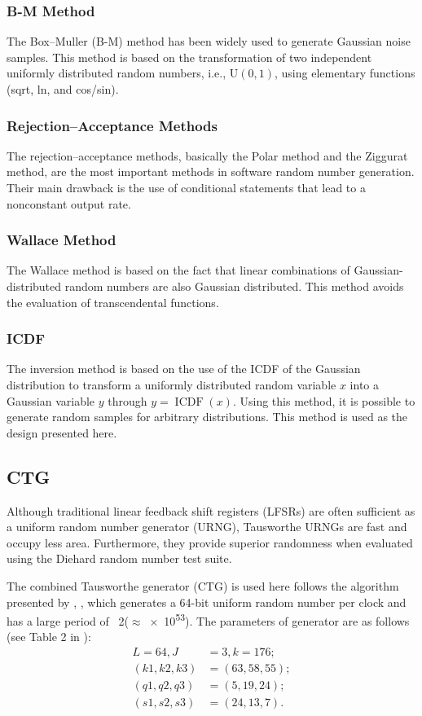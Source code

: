 \documentclass[a4paper, titlepage]{article}
\DeclareMathOperator{\ICDF}{ICDF}
\begin{document}
\subsubsection{B-M Method}
The Box–Muller (B-M) method has been widely used to generate
Gaussian noise samples.
This method is based on the transformation of two independent uniformly
distributed random numbers, i.e., $\mathrm{U}(0,1)$,
using elementary functions (sqrt, ln, and cos/sin).

\subsubsection{Rejection–Acceptance Methods}
The rejection–acceptance methods, basically the Polar method and
the Ziggurat method, are the most important methods in
software random number generation.
Their main drawback is the use of conditional statements that
lead to a nonconstant output rate.

\subsubsection{Wallace Method}
The Wallace method is based on the fact that linear combinations of
Gaussian-distributed random numbers are also Gaussian distributed.
This method avoids the evaluation of transcendental functions.

\subsubsection{ICDF}
The inversion method is based on the use of the ICDF of
the Gaussian distribution to transform a uniformly distributed random
variable $x$ into a Gaussian variable $y$ through $y = \ICDF(x)$.
Using this method, it is possible to generate random samples for
arbitrary distributions.
This method is used as the design presented here.

\subsection{CTG}
Although traditional linear feedback shift registers (LFSRs) are often
sufficient as a uniform random number generator (URNG),
Tausworthe URNGs are fast and occupy less area.
Furthermore, they provide superior randomness when
evaluated using the Diehard random number test suite.

The combined Tausworthe generator (CTG) is used here follows the algorithm
presented by \cite{lecuyer1}, \cite{lecuyer2},
which generates a 64-bit uniform random number per clock
and has a large period of \si{2}($\approx$\num{e53}).
The parameters of generator are as follows (see Table 2 in \cite{lecuyer2}):
\begin{align}
    L = 64, J &= 3, k = 176; \\
    (k1, k2, k3) &= (63, 58, 55); \\
    (q1, q2, q3) &= (5, 19, 24); \\
    (s1, s2, s3) &= (24, 13, 7).
\end{align}
\end{document}
